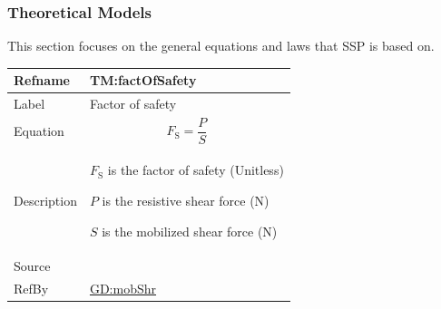 \documentclass[12pt]{article}
\begin{document}
\subsubsection{Theoretical Models}
\label{Sec:TMs}
This section focuses on the general equations and laws that SSP is based on.

\medskip
\noindent
\begin{minipage}{\textwidth}
\begin{tabular}{>{\raggedright}p{}>{\raggedright\arraybackslash}p{}}
\toprule \textbf{Refname} & \textbf{TM:factOfSafety}
\label{TM:factOfSafety}
\\ \midrule
Label & Factor of safety
        
\\ \midrule
Equation & \begin{displaymath}
           {F_{\text{S}}}=\frac{P}{S}
           \end{displaymath}
\\ \midrule
Description & \begin{symbDescription}
              \item{${F_{\text{S}}}$ is the factor of safety (Unitless)}
              \item{$P$ is the resistive shear force (${\text{N}}$)}
              \item{$S$ is the mobilized shear force (${\text{N}}$)}
              \end{symbDescription}
\\ \midrule
Source & \cite{fredlund1977}
         
\\ \midrule
RefBy & \hyperref[GD:mobShr]{GD:mobShr}
        
\\ \bottomrule
\end{tabular}
\end{minipage}
\end{document}
